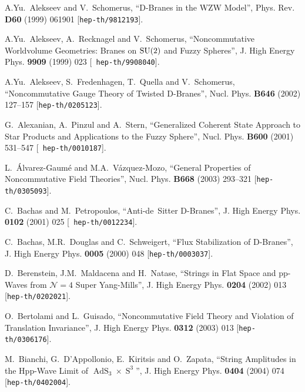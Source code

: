 \documentclass[11pt,a4paper]{article}
\DeclareMathOperator{\AdS}{AdS}
\DeclareMathOperator{\Sphere}{S}
\let\S\Sphere
\begin{document}
\begin{thebibliography}{99}

\baselineskip=12pt

 A.Yu.~Alekseev and V.~Schomerus, ``D-Branes in the WZW
  Model'', Phys. Rev. {\bf D60} (1999) 061901 [{\tt hep-th/9812193}].

 A.Yu.~Alekseev, A.~Recknagel and V.~Schomerus,
  ``Noncommutative Worldvolume Geometries: Branes on ${\rm SU}(2)$ and
  Fuzzy Spheres'', J. High Energy Phys. {\bf 9909} (1999) 023 [{\tt
    hep-th/9908040}].

 A.Yu.~Alekseev, S.~Fredenhagen, T.~Quella and
  V.~Schomerus, ``Noncommutative Gauge Theory of Twisted D-Branes'',
  Nucl. Phys. {\bf B646} (2002) 127--157 [{\tt hep-th/0205123}].

 G.~Alexanian, A.~Pinzul and A.~Stern, ``Generalized
  Coherent State Approach to Star Products and Applications to the
  Fuzzy Sphere'', Nucl. Phys. {\bf B600} (2001) 531--547 [{\tt
    hep-th/0010187}].

 L.~\'Alvarez-Gaum\'e and M.A.~V\'azquez-Mozo, ``General
  Properties of Noncommutative Field Theories'', Nucl. Phys. {\bf
    B668} (2003) 293--321 [{\tt hep-th/0305093}].

 C.~Bachas and M.~Petropoulos, ``Anti-de~Sitter
  D-Branes'', J. High Energy Phys. {\bf 0102} (2001) 025 [{\tt
  hep-th/0012234}].

 C.~Bachas, M.R.~Douglas and C.~Schweigert, ``Flux
  Stabilization of D-Branes'', J. High Energy Phys. {\bf 0005} (2000)
  048 [{\tt hep-th/0003037}].

 D.~Berenstein, J.M.~Maldacena and H.~Natase, ``Strings
  in Flat Space and pp-Waves from $\mathcal{N}=4$ Super Yang-Mills'',
  J. High Energy Phys. {\bf 0204} (2002) 013 [{\tt hep-th/0202021}].

 O.~Bertolami and L.~Guisado, ``Noncommutative Field
  Theory and Violation of Translation Invariance'', J. High Energy
  Phys. {\bf 0312} (2003) 013 [{\tt hep-th/0306176}].

 M.~Bianchi, G.~D'Appollonio, E.~Kiritsis and
  O.~Zapata, ``String Amplitudes in the Hpp-Wave Limit of
  $\AdS_3\times\S^3$'', J. High Energy Phys. {\bf 0404} (2004) 074
  [{\tt hep-th/0402004}].


\end{thebibliography}
\end{document}
